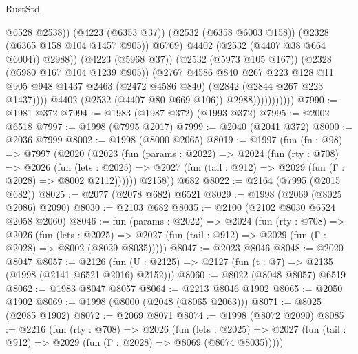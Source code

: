 \begin{lexlean}{RustStd}
\begin{coremodule}
                                      @6528
                                      @2538))
                                  (@4223 (@6353 @37))
                                  (@2532 (@6358 @6003 @158))
                                  (@2328 (@6365 @158 @104 @1457 @905))
                                  @6769)
                                @4402
                                (@2532 (@4407 @38 @664 @6004))
                                @2988))
                            (@4223 (@5968 @37))
                            (@2532 (@5973 @105 @167))
                            (@2328 (@5980 @167 @104 @1239 @905))
                            (@2767
                              @4586
                              @840
                              @267
                              @223
                              @128
                              @11
                              @905
                              @948
                              @1437
                              @2463
                              (@2472 @4586 @840)
                              (@2842 (@2844 @267 @223 @1437))))
                          @4402
                          (@2532 (@4407 @80 @669 @106))
                          @2988)))))))))))
@7990 := @1981 @372
@7994 := @1983 (@1987 @372) (@1993 @372)
@7995 := @2002 @6518
@7997 := @1998 (@7995 @2017)
@7999 := @2040 (@2041 @372)
@8000 := @2036 @7999
@8002 := @1998 (@8000 @2065)
@8019 := @1997
    (fun (fn : @98) =>
    @7997
      (@2020
        (@2023
          (fun (params : @2022) =>
          @2024
            (fun (rty : @708) =>
            @2026
              (fun (lets : @2025) =>
              @2027 (fun (tail : @912) => @2029 (fun (Γ : @2028) => @8002 @2112))))))
        @2158))
    @682
@8022 := @2164 (@7995 (@2015 @682))
@8025 := @2077 (@2078 @682) @6521
@8029 := @1998 (@2069 (@8025 @2086) @2090)
@8030 := @2103 @682
@8035 := @2100 (@2102 @8030 @6524 @2058 @2060)
@8046 := fun (params : @2022) =>
  @2024
    (fun (rty : @708) =>
    @2026
      (fun (lets : @2025) =>
      @2027 (fun (tail : @912) => @2029 (fun (Γ : @2028) => @8002 (@8029 @8035)))))
@8047 := @2023 @8046
@8048 := @2020 @8047
@8057 := @2126 (fun (U : @2125) => @2127 (fun (t : @7) => @2135 (@1998 (@2141 @6521 @2016) @2152)))
@8060 := @8022 (@8048 @8057) @6519
@8062 := @1983 @8047 @8057
@8064 := @2213 @8046 @1902
@8065 := @2050 @1902
@8069 := @1998 (@8000 (@2048 (@8065 @2063)))
@8071 := @8025 (@2085 @1902)
@8072 := @2069 @8071
@8074 := @1998 (@8072 @2090)
@8085 := @2216
    (fun (rty : @708) =>
    @2026
      (fun (lets : @2025) =>
      @2027 (fun (tail : @912) => @2029 (fun (Γ : @2028) => @8069 (@8074 @8035)))))

\end{coremodule}
\end{lexlean}
